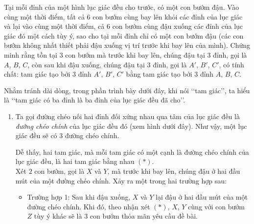 \begin{bt}%
Tại mỗi đỉnh của một hình lục giác đều cho trước, có một con bướm đậu. Vào cùng một thời điểm, tất cả $6$ con bướm cùng bay lên khỏi các đỉnh của lục giác và lại vào cùng một thời điểm, cả $6$ con bướm cùng đậu xuống các đỉnh của lục giác đó một cách tùy ý, sao cho tại mỗi đỉnh chỉ có một con bướm đậu (các con bướm không nhất thiết phải đậu xuống vị trí trước khi bay lên của mình). Chứng minh rằng tồn tại $3$ con bướm mà trước khi bay lên, chúng đậu tại $3$ đỉnh, gọi là $A$, $B$, $C$, còn sau khi đậu xuống, chúng đậu tại $3$ đỉnh, gọi là $A'$, $B'$, $C'$, có tính chất: tam giác tạo bởi $3$ đỉnh $A'$, $B'$, $C'$ bằng tam giác tạo bởi $3$ đỉnh $A$, $B$, $C$.
\loigiai
{Nhằm tránh dài dòng, trong phần trình bày dưới đây, khi nói \lq\lq tam giác\rq\rq, ta hiểu là \lq\lq tam giác có ba đỉnh là ba đỉnh của lục giác đều đã cho\rq\rq.
\begin{enumerate}[\bf Cách \bf 1:]
\item
Ta gọi đường chéo nối hai đỉnh đối xứng nhau qua tâm của lục giác đều là \emph{đường chéo chính} của lục giác đều đó (xem hình dưới đây). Như vậy, một lục giác đều sẽ có $3$ đường chéo chính.
\begin{center}
\end{center}
Dễ thấy, hai tam giác, mà mỗi tam giác có một cạnh là đường chéo chính của lục giác đều, là hai tam giác bằng nhau \hfill $(\ast)$.\\
Xét $2$ con bướm, gọi là $X$ và $Y$, mà trước khi bay lên, chúng đậu ở hai đầu mút của một đường chéo chính. Xảy ra một trong hai trường hợp sau:
\begin{itemize}
 \item Trường hợp 1: Sau khi đậu xuống, $X$ và $Y$ lại đậu ở hai đầu mút của một đường chéo chính. Khi đó, theo nhận xét $(\ast)$, $X$, $Y$ cùng với con bướm $Z$ tùy ý khác sẽ là $3$ con bướm thỏa mãn yêu cầu đề bài.

\end{itemize}
\end{enumerate}}
\end{bt}
